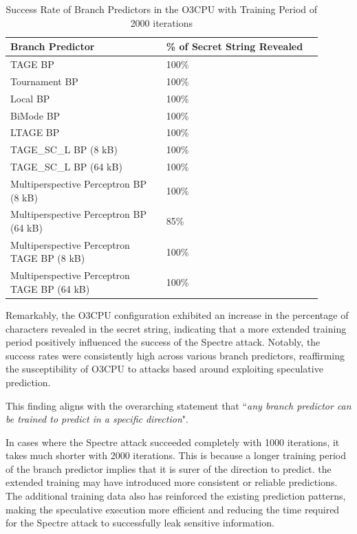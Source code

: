 \documentclass[twocolumn,showpacs,%
  nofootinbib,aps,superscriptaddress,%
  eqsecnum,prd,notitlepage,showkeys,10pt]{revtex4-1}
\begin{document}
\begin{table}
\centering
\caption{Success Rate of Branch Predictors in the O3CPU with Training Period of 2000 iterations}
\small
\begin{tabular}{p{0.45\linewidth}p{0.45\linewidth}}
\hline
Branch Predictor & \% of Secret String Revealed \\
\hline
TAGE BP & 100\% \\
Tournament BP & 100\% \\
Local BP & 100\% \\
BiMode BP & 100\% \\
LTAGE BP & 100\% \\
TAGE\_SC\_L BP (8 kB) & 100\% \\
TAGE\_SC\_L BP (64 kB) & 100\% \\
Multiperspective Perceptron BP (8 kB) & 100\% \\
Multiperspective Perceptron BP (64 kB) & 85\% \\
Multiperspective Perceptron TAGE BP (8 kB) & 100\% \\
Multiperspective Perceptron TAGE BP (64 kB) & 100\% \\
\hline
\end{tabular}
\end{table}

Remarkably, the O3CPU configuration exhibited an increase in the percentage of characters revealed in the secret string, indicating that a more extended training period positively influenced the success of the Spectre attack. Notably, the success rates were consistently high across various branch predictors, reaffirming the susceptibility of O3CPU to attacks based around exploiting speculative prediction.

This finding aligns with the overarching statement that ``\textit{any branch predictor can be trained to predict in a specific direction}".

In cases where the Spectre attack succeeded completely with 1000 iterations, it takes much shorter with 2000 iterations. This is because a longer training period of the branch predictor implies that it is surer of the direction to predict. the extended training may have introduced more consistent or reliable predictions. The additional training data also has reinforced the existing prediction patterns, making the speculative execution more efficient and reducing the time required for the Spectre attack to successfully leak sensitive information.
\end{document}
